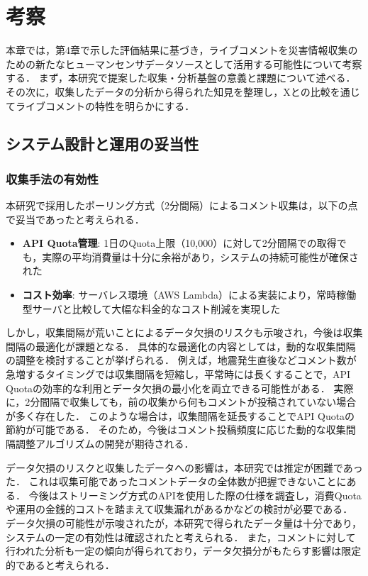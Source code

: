\chapter{考察}

本章では，第4章で示した評価結果に基づき，ライブコメントを災害情報収集のための新たなヒューマンセンサデータソースとして活用する可能性について考察する．
まず，本研究で提案した収集・分析基盤の意義と課題について述べる．
その次に，収集したデータの分析から得られた知見を整理し，Xとの比較を通じてライブコメントの特性を明らかにする．



\section{システム設計と運用の妥当性}

\subsection{収集手法の有効性}

本研究で採用したポーリング方式（2分間隔）によるコメント収集は，以下の点で妥当であったと考えられる．

\begin{itemize}
    \item \textbf{API Quota管理}: 1日のQuota上限（10,000）に対して2分間隔での取得でも，実際の平均消費量は十分に余裕があり，システムの持続可能性が確保された
    \item \textbf{コスト効率}: サーバレス環境（AWS Lambda）による実装により，常時稼働型サーバと比較して大幅な料金的なコスト削減を実現した
\end{itemize}

しかし，収集間隔が荒いことによるデータ欠損のリスクも示唆され，今後は収集間隔の最適化が課題となる．
具体的な最適化の内容としては，動的な収集間隔の調整を検討することが挙げられる．
例えば，地震発生直後などコメント数が急増するタイミングでは収集間隔を短縮し，平常時には長くすることで，API Quotaの効率的な利用とデータ欠損の最小化を両立できる可能性がある．
実際に，2分間隔で収集しても，前の収集から何もコメントが投稿されていない場合が多く存在した．
このような場合は，収集間隔を延長することでAPI Quotaの節約が可能である．
そのため，今後はコメント投稿頻度に応じた動的な収集間隔調整アルゴリズムの開発が期待される．

データ欠損のリスクと収集したデータへの影響は，本研究では推定が困難であった．
これは収集可能であったコメントデータの全体数が把握できないことにある．
今後はストリーミング方式のAPI\cite{livechat_stream}を使用した際の仕様を調査し，消費Quotaや運用の金銭的コストを踏まえて収集漏れがあるかなどの検討が必要である．
データ欠損の可能性が示唆されたが，本研究で得られたデータ量は十分であり，システムの一定の有効性は確認されたと考えられる．
また，コメントに対して行われた分析も一定の傾向が得られており，データ欠損分がもたらす影響は限定的であると考えられる． 

